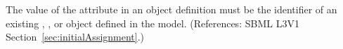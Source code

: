 The value of the  attribute in an \InitialAssignment object
definition must be the identifier of an existing \Compartment, \Species,
\Parameter or \SpeciesReference object defined in the model.  (References:
SBML L3V1 Section~\ref{sec:initialAssignment}.)
